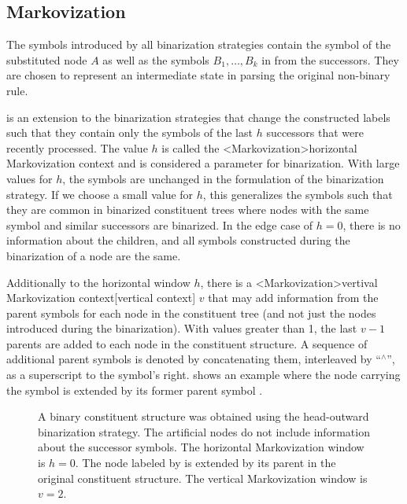 \documentclass[../../document.tex]{subfiles}
\begin{document}
    \subsection{Markovization}
    The symbols introduced by all binarization strategies contain the symbol of the substituted node \(A\) as well as the symbols \(B_1, \ldots, B_k\) in from the successors.
    They are chosen to represent an intermediate state in parsing the original non-binary rule.

     is an extension to the binarization strategies that change the constructed labels such that they contain only the symbols of the last \(h\) successors that were recently processed.
    The value \(h\) is called the <Markovization>{horizontal Markovization context} and is considered a parameter for binarization.
    With large values for \(h\), the symbols are unchanged in the formulation of the binarization strategy.
    If we choose a small value for \(h\), this generalizes the symbols such that they are common in binarized constituent trees where nodes with the same symbol and similar successors are binarized.
    In the edge case of \(h=0\), there is no information about the children, and all symbols constructed during the binarization of a node are the same.

    Additionally to the horizontal window \(h\), there is a <Markovization>{vertival Markovization context}[vertical context] \(v\) that may add information from the parent symbols for each node in the constituent tree (and not just the nodes introduced during the binarization).
    With values greater than 1, the last \(v-1\) parents are added to each node in the constituent structure.
    A sequence of additional parent symbols is denoted by concatenating them, interleaved by ``$^\wedge$'', as a superscript to the symbol's right.
     shows an example where the node carrying the symbol  is extended by its former parent symbol .

    \begin{figure}
        \centering
        
        \caption{\label{fig:ex:markovization}
            A binary constituent structure was obtained using the head-outward binarization strategy.
            The artificial nodes do not include information about the successor symbols. The horizontal Markovization window is \(h = 0\).
            The node labeled by \label{np} is extended by its parent in the original constituent structure. The vertical Markovization window is \(v = 2\).}
    \end{figure}
\end{document}
